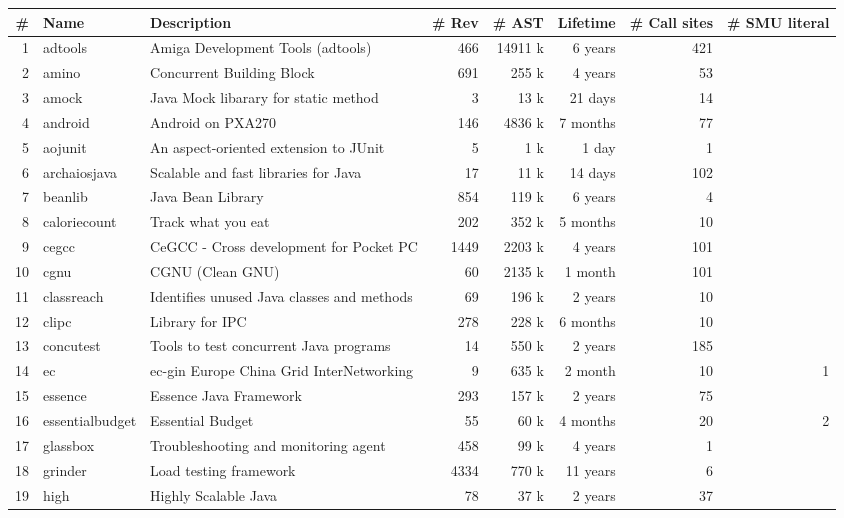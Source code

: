 
\begin{table}[ht]
\centering
\begin{tabular}{|r|l|l|r|r|r|r|r|} \hline    

 \# & Name & Description & \# Rev & \# AST & Lifetime & \# Call sites & \# SMU literal \\ \hline
  1 & adtools & Amiga Development Tools (adtools) & 466 & 14911 k & 6 years  & 421 & \\ 
  2 & amino & Concurrent Building Block & 691 & 255 k & 4 years  &  53 & \\ 
  3 & amock & Java Mock libarary for static method &   3 & 13 k &  21 days &  14 & \\ 
  4 & android & Android on PXA270   & 146 & 4836 k &  7 months  &  77 & \\ 
  5 & aojunit & An aspect-oriented extension to JUnit   &   5 & 1 k & 1 day &   1 & \\ 
  6 & archaiosjava & Scalable and fast libraries for Java  &  17 & 11 k &  14 days & 102 & \\ 
  7 & beanlib & Java Bean Library  & 854 & 119 k & 6 years  &   4 & \\ 
  8 & caloriecount & Track what you eat  & 202 & 352 k &  5 months &  10 & \\ 
  9 & cegcc & CeGCC - Cross development for Pocket PC  & 1449 & 2203 k & 4 years & 101 & \\ 
  10 & cgnu & CGNU (Clean GNU)  &  60 & 2135 k &  1 month & 101 & \\ 
  11 & classreach & Identifies unused Java classes and methods  &  69 & 196 k & 2 years & 10 & \\ 
  12 & clipc & Library for IPC  & 278 & 228 k &  6 months &  10 & \\ 
  13 & concutest & Tools to test concurrent Java programs & 14 & 550 k & 2 years  & 185 & \\ 
  14 & ec & ec-gin Europe China Grid InterNetworking    &   9 & 635 k &  2 month  &  10 & 1 \\ 
  15 & essence & Essence Java Framework    & 293 & 157 k & 2 years &  75 & \\ 
  16 & essentialbudget & Essential Budget   &  55 & 60 k &  4 months &  20 & 2 \\ 
  17 & glassbox & Troubleshooting and monitoring agent  & 458 & 99 k & 4 years &   1 & \\ 
  18 & grinder & Load testing framework  & 4334 & 770 k & 11 years  &   6 & \\ 
  19 & high & Highly Scalable Java   &  78 & 37 k & 2 years &  37 & \\ 

\end{tabular}
\end{table}
